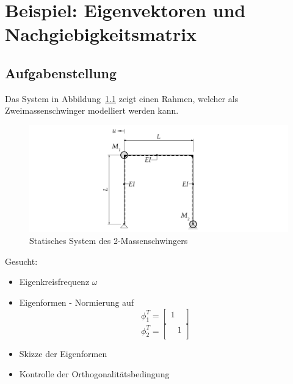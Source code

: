 \documentclass[
  letterpaper,
  DIV=11]{scrreprt}
\begin{document}
\hypertarget{beispiel-eigenvektoren-und-nachgiebigkeitsmatrix}{%
\chapter{Beispiel: Eigenvektoren und
Nachgiebigkeitsmatrix}\label{beispiel-eigenvektoren-und-nachgiebigkeitsmatrix}}

\hypertarget{aufgabenstellung-11}{%
\section{Aufgabenstellung}\label{aufgabenstellung-11}}

Das System in Abbildung~\ref{fig-mms_nach_system} zeigt einen Rahmen,
welcher als Zweimassenschwinger modelliert werden kann.

\begin{figure}[H]

{\centering \includegraphics{index_files/mediabag/bilder/aufgabe_mms_nach_system.pdf}

}

\caption{\label{fig-mms_nach_system}Statisches System des
2-Massenschwingers}

\end{figure}

Gesucht:

\begin{itemize}
\item
  Eigenkreisfrequenz \(\omega\)
\item
  Eigenformen - Normierung auf \[\phi_1^T = 
  \begin{bmatrix}
  1 &  \\
  \end{bmatrix} \] \[\phi_2^T =
  \begin{bmatrix}
   & 1 \\
  \end{bmatrix}\]
\item
  Skizze der Eigenformen
\item
  Kontrolle der Orthogonalitätsbedingung
\end{itemize}
\end{document}
